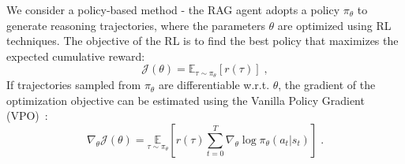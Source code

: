 
We consider a policy-based method - the RAG agent adopts a policy $\pi_\theta$ to generate reasoning trajectories, where the parameters $\theta$ are optimized using RL techniques.
The objective of the RL is to find  the best policy that maximizes the expected cumulative reward:
\begin{equation}
\label{eq_obj}
     \mathcal{J}(\theta) = \mathbb{E}_{\tau \sim \pi_{\theta}} [r(\tau)] \; ,
\end{equation}
If trajectories sampled from $\pi_\theta$ are differentiable w.r.t. $\theta$, the gradient of the optimization objective can be estimated using the Vanilla Policy Gradient (VPO)~\citep{williams1992simple}:
\begin{equation}
\label{eq_vpo} %
\nabla_\theta \mathcal{J}(\theta) = \underset{\tau \sim \pi_{\theta}}{\mathbb{E}}
\left[ r(\tau) \sum_{t=0}^T \nabla_\theta \log \pi_\theta (a_t | s_t) \right] \;.
\end{equation}


